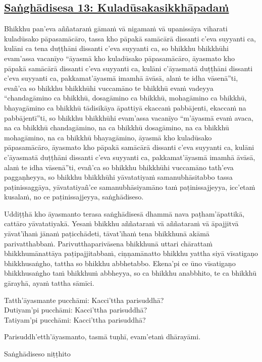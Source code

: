 \subsection*{\hyperref[comm13]{Saṅghādisesa 13: Kuladūsakasikkhāpadaṁ}}
\label{sd13}
Bhikkhu pan'eva aññataraṁ gāmaṁ vā nigamaṁ vā upanissāya viharati kuladūsako pāpasamācāro, tassa kho pāpakā samācārā dissanti c'eva suyyanti ca, kulāni ca tena duṭṭhāni dissanti c'eva suyyanti ca, so bhikkhu bhikkhūhi evam'assa vacanīyo “āyasmā kho kuladūsako pāpasamācāro, āyasmato kho pāpakā samācārā dissanti c'eva suyyanti ca, kulāni c'āyasmatā duṭṭhāni dissanti c'eva suyyanti ca, pakkamat'āyasmā imamhā āvāsā, alaṁ te idha vāsenā”ti, evañ'ca so bhikkhu bhikkhūhi vuccamāno te bhikkhū evaṁ vadeyya “chandagāmino ca bhikkhū, dosagāmino ca bhikkhū, mohagāmino ca bhikkhū, bhayagāmino ca bhikkhū tādisikāya āpattiyā ekaccaṁ pabbājenti, ekaccaṁ na pabbājentī”ti, so bhikkhu bhikkhūhi evam'assa vacanīyo “m'āyasmā evaṁ avaca, na ca bhikkhū chandagāmino, na ca bhikkhū dosagāmino, na ca bhikkhū mohagāmino, na ca bhikkhū bhayagāmino, āyasmā kho kuladūsako pāpasamācāro, āyasmato kho pāpakā samācārā dissanti c'eva suyyanti ca, kulāni c'āyasmatā duṭṭhāni dissanti c'eva suyyanti ca, pakkamat'āyasmā imamhā āvāsā, alaṁ te idha vāsenā”ti, evañ'ca so bhikkhu bhikkhūhi vuccamāno tath'eva paggaṇheyya, so bhikkhu bhikkhūhi yāvatatiyaṁ samanubhāsitabbo tassa paṭinissaggāya, yāvatatiyañ'ce samanubhāsiyamāno taṁ paṭinissajjeyya, icc'etaṁ kusalaṁ, no ce paṭinissajjeyya, saṅghādiseso.

\medskip

\begin{center}
Uddiṭṭhā kho āyasmanto terasa saṅghādisesā dhammā nava paṭham'āpattikā, cattāro yāvatatiyakā. Yesaṁ bhikkhu aññataraṁ vā aññataraṁ vā āpajjitvā yāvat'īhaṁ jānaṁ paṭicchādeti, tāvat'īhaṁ tena bhikkhunā akāmā parivatthabbaṁ. Parivutthaparivāsena bhikkhunā uttari chārattaṁ bhikkhumānattāya paṭipajjitabbaṁ, ciṇṇamānatto bhikkhu yattha siyā vīsatigaṇo bhikkhusaṅgho, tattha so bhikkhu abbhetabbo. Ekena'pi ce ūno vīsatigaṇo bhikkhusaṅgho taṁ bhikkhuṁ abbheyya, so ca bhikkhu anabbhito, te ca bhikkhū gārayhā, ayaṁ tattha sāmīci.

\smallskip

Tatth'āyasmante pucchāmi: Kacci'ttha parisuddhā?\\
Dutiyam'pi pucchāmi: Kacci'ttha parisuddhā?\\
Tatiyam'pi pucchāmi: Kacci'ttha parisuddhā?

\smallskip

Parisuddh'etth'āyasmanto, tasmā tuṇhī, evam'etaṁ dhārayāmi.
\end{center}

\begin{outro}
  Saṅghādiseso niṭṭhito
\end{outro}

\clearpage
